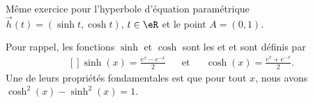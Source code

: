 \begin{exercice}\label{exoCourbesSurfaces0010}

Même exercice pour l'hyperbole d'équation paramétrique $\vec{h}(t) = (\sinh t, \cosh t)$, $ t \in \eR$ et le point $ A = (0, 1)$. 

Pour rappel, les fonctions $\sinh$ et $\cosh$ sont les  et  et sont définis par
\begin{equation}
	\begin{aligned}[]
		\sinh(x)=\frac{  e^{x}- e^{-x} }{ 2 }&&\text{et}&&\cosh(x)=\frac{  e^{x}+ e^{-x} }{ 2 }.
	\end{aligned}
\end{equation}
Une de leurs propriétés fondamentales est que pour tout $x$, nous avons $\cosh^2(x)-\sinh^2(x)=1$.

\end{exercice}
